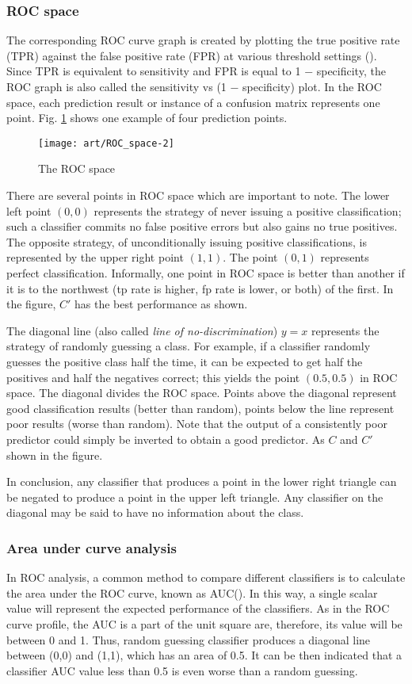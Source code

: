 \subsubsection{ROC space}
The corresponding ROC curve graph is created by plotting the true positive rate (TPR) against the false positive rate (FPR) at various threshold settings (\citet{Fawcett2006}).  Since TPR is equivalent to sensitivity and FPR is equal to 1 − specificity, the ROC graph is also called the sensitivity vs (1 − specificity) plot. In the ROC space, each prediction result or instance of a confusion matrix represents one point. Fig. \ref{ROC_space} shows one example of four prediction points.
\begin{figure}[ht]
	\centering
	\texttt{[image: art/ROC\_space-2]}
	\caption{The ROC space}
	\label{ROC_space}
\end{figure}
There are several points in ROC space which are important to note. The lower left point $ (0,0) $ represents the strategy of never issuing a positive classification; such a classifier commits no false positive errors but also gains no true positives. The opposite strategy, of unconditionally issuing positive classifications, is represented by the upper right point $ (1,1) $. The point $ (0,1) $ represents perfect classification.  Informally, one point in ROC space is better than another if it is to the northwest (tp rate is higher, fp rate is lower, or both) of the first. In the figure, $C'$ has the best performance as shown.

The diagonal line (also called \textit{line of no-discrimination}) $y = x$ represents the strategy of randomly guessing a class. For example, if a classifier randomly guesses the positive class half the time, it can be expected to get half the positives and half the negatives correct; this yields the point $ (0.5, 0.5) $ in ROC space. The diagonal divides the ROC space. Points above the diagonal represent good classification results (better than random), points below the line represent poor results (worse than random). Note that the output of a consistently poor predictor could simply be inverted to obtain a good predictor. As $C$ and $C'$ shown in the figure.

In conclusion,  any classifier that produces a point in the lower right triangle can be negated to produce a point in the upper left triangle. Any classifier on the diagonal may be said to have no information about the class.

\subsubsection{Area under curve analysis}
In ROC analysis, a common method to compare different classifiers is to calculate the area under the ROC curve, known as AUC(\citet{Fawcett2006}). In this way, a single scalar value will represent the expected performance of the classifiers. As in the ROC curve profile, the AUC is a part of the unit square are, therefore, its value will be between 0 and 1. Thus, random guessing classifier produces a diagonal line between (0,0) and (1,1), which has an area of 0.5. It can be then indicated that a classifier AUC value less than 0.5 is even worse than a random guessing. 

